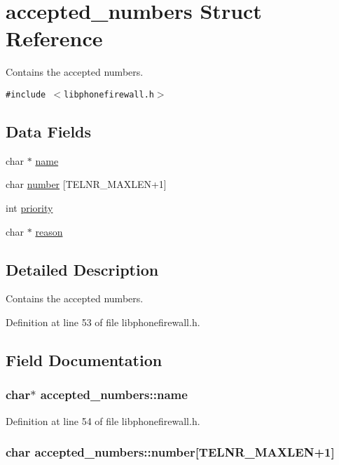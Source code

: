 \hypertarget{structaccepted__numbers}{
\section{accepted\_\-numbers Struct Reference}
\label{structaccepted__numbers}
}
Contains the accepted numbers.  


{\tt \#include $<$libphonefirewall.h$>$}

\subsection*{Data Fields}
\begin{CompactItemize}
\item 
char $\ast$ \hyperlink{structaccepted__numbers_505c8583cffe8e9b53dc58fe7eb13def}{name}
\item 
char \hyperlink{structaccepted__numbers_fe318a7007a7010c056f76b2348b4333}{number} \mbox{[}TELNR\_\-MAXLEN+1\mbox{]}
\item 
int \hyperlink{structaccepted__numbers_709eeeb6f0ffed0613b91b5650a38a6b}{priority}
\item 
char $\ast$ \hyperlink{structaccepted__numbers_7d0d86f3bc0a4e9a70a033dfb8bd735f}{reason}
\end{CompactItemize}


\subsection{Detailed Description}
Contains the accepted numbers. 

Definition at line 53 of file libphonefirewall.h.

\subsection{Field Documentation}
\hypertarget{structaccepted__numbers_505c8583cffe8e9b53dc58fe7eb13def}{
\subsubsection{\setlength{\rightskip}{0pt plus 5cm}char$\ast$ {\bf accepted\_\-numbers::name}}}
\label{structaccepted__numbers_505c8583cffe8e9b53dc58fe7eb13def}




Definition at line 54 of file libphonefirewall.h.\hypertarget{structaccepted__numbers_fe318a7007a7010c056f76b2348b4333}{
\subsubsection{\setlength{\rightskip}{0pt plus 5cm}char {\bf accepted\_\-numbers::number}\mbox{[}TELNR\_\-MAXLEN+1\mbox{]}}}
\label{structaccepted__numbers_fe318a7007a7010c056f76b2348b4333}




